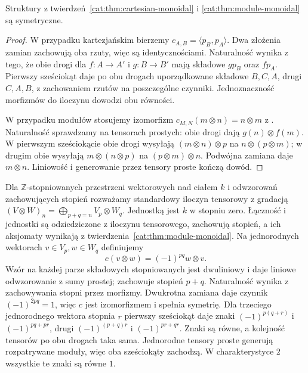 \begin{stwierdzenie}\label{cat:prop:cartesian-tensor-symmetry}
Struktury z twierdzeń~\ref{cat:thm:cartesian-monoidal} i \ref{cat:thm:module-monoidal} są symetryczne.
\end{stwierdzenie}
\begin{proof}
W przypadku kartezjańskim bierzemy $c_{A,B}=\langle p_B,p_A\rangle$. Dwa złożenia zamian zachowują oba rzuty, więc są identycznościami. Naturalność wynika z tego, że obie drogi dla $f:A\to A'$ i $g:B\to B'$ mają składowe $g p_B$ oraz $f p_A$. Pierwszy sześciokąt daje po obu drogach uporządkowane składowe $B,C,A$, drugi $C,A,B$, z zachowaniem rzutów na poszczególne czynniki. Jednoznaczność morfizmów do iloczynu dowodzi obu równości.

W przypadku modułów stosujemy izomorfizm $c_{M,N}(m\otimes n)=n\otimes m$ z . Naturalność sprawdzamy na tensorach prostych: obie drogi dają $g(n)\otimes f(m)$. W pierwszym sześciokącie obie drogi wysyłają $(m\otimes n)\otimes p$ na $n\otimes(p\otimes m)$; w drugim obie wysyłają $m\otimes(n\otimes p)$ na $(p\otimes m)\otimes n$. Podwójna zamiana daje $m\otimes n$. Liniowość i generowanie przez tensory proste kończą dowód.
\end{proof}

\begin{przyklad}\label{cat:ex:graded-symmetry}
Dla $\mathbb Z$-stopniowanych przestrzeni wektorowych nad ciałem $k$ i odwzorowań zachowujących stopień rozważamy standardowy iloczyn tensorowy z gradacją $(V\otimes W)_n=\bigoplus_{p+q=n}V_p\otimes W_q$. Jednostką jest $k$ w stopniu zero. Łączność i jednostki są odziedziczone z iloczynu tensorowego, zachowują stopień, a ich aksjomaty wynikają z twierdzenia~\ref{cat:thm:module-monoidal}.
Na jednorodnych wektorach $v\in V_p,w\in W_q$ definiujemy
\[
c(v\otimes w)=(-1)^{pq}w\otimes v.
\]
Wzór na każdej parze składowych stopniowanych jest dwuliniowy i daje liniowe odwzorowanie z sumy prostej; zachowuje stopień $p+q$. Naturalność wynika z zachowywania stopni przez morfizmy. Dwukrotna zamiana daje czynnik $(-1)^{2pq}=1$, więc $c$ jest izomorfizmem i spełnia symetrię. Dla trzeciego jednorodnego wektora stopnia $r$ pierwszy sześciokąt daje znaki $(-1)^{p(q+r)}$ i $(-1)^{pq+pr}$, drugi $(-1)^{(p+q)r}$ i $(-1)^{pr+qr}$. Znaki są równe, a kolejność tensorów po obu drogach taka sama. Jednorodne tensory proste generują rozpatrywane moduły, więc oba sześciokąty zachodzą. W charakterystyce $2$ wszystkie te znaki są równe $1$.
\end{przyklad}

